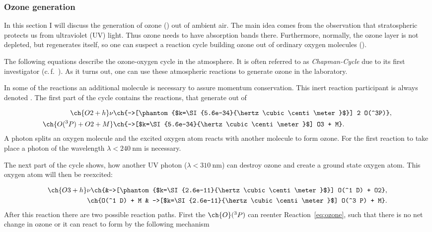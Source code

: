 \subsubsection{Ozone generation}
\label{sec:theory-ozone}

In this section I will discuss the generation of ozone () out of ambient
air. The main idea comes from the observation that stratospheric
 protects us from ultraviolet (UV) light. Thus ozone needs to
have absorption bands there. Furthermore, normally, the ozone layer is
not depleted, but regenerates itself, so one can suspect a reaction
cycle building ozone out of ordinary oxygen molecules ().

The following equations describe the ozone-oxygen cycle in the
atmosphere.  It is often referred to as \emph{Chapman-Cycle} due to
its first investigator (c.\,f.~\cite{chapman,roedel}). As it turns
out, one can use these atmospheric reactions to generate ozone in the
laboratory.

In some of the reactions an additional molecule is necessary to assure
momentum conservation. This inert reaction participant is always
denoted . The first part of the cycle contains the reactions,
that generate  out of 

\begin{align}
  \ch{O2 + h}\nu &\ch{->[\phantom{$k=\SI{5.6e-34}{\hertz\cubic\centi\meter}$}] 2 O(^3P)},\nonumber\\
  \ch{O(^3 P) + O2 + M} &\ch{->[$k=\SI{5.6e-34}{\hertz\cubic\centi\meter}$] O3 + M}. \label{eq:ozone}
\end{align}
A photon splits an oxygen molecule and the excited oxygen atom reacts
with another  molecule to form ozone. For the first reaction to
take place a photon of the wavelength
$\lambda < \SI{240}{\nano\meter}$ is necessary.

The next part of the cycle shows, how another UV photon ($\lambda <
\SI{310}{\nano\meter}$) can destroy
ozone and create a ground state oxygen atom. This oxygen atom will
then be reexcited:

\begin{align}
  \ch{O3 + h}\nu \ch{&->[\phantom{$k=\SI{2.6e-11}{\hertz\cubic\centi\meter}$}] O(^1 D) +
  O2}, \label{eq:split}\\
  \ch{O(^1 D) + M & ->[$k=\SI{2.6e-11}{\hertz\cubic\centi\meter}$] O(^3 P) + M}.\nonumber
\end{align}
After this reaction there are two possible reaction paths. First the $\ch{O}(^3
P)$ can reenter Reaction~\eqref{eq:ozone}, such that there is no
net change in ozone or it can react to form  by the
following mechanism

